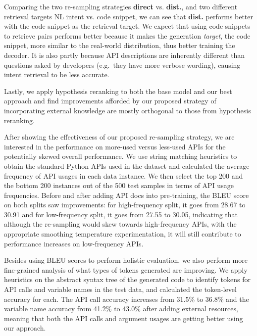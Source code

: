 \documentclass[11pt,a4paper]{article}
\begin{document}
Comparing the two re-sampling strategies \textbf{direct} vs. \textbf{dist.}, and two different retrieval targets NL intent vs. code snippet, we can see that \textbf{dist.} performs better with the code snippet as the retrieval target.
We expect that using code snippets to retrieve pairs performs better because it makes the generation \emph{target}, the code snippet, more similar to the real-world distribution, thus better training the decoder.
It is also partly because API descriptions are inherently different than questions asked by developers (e.g.~they have more verbose wording), causing intent retrieval to be less accurate. 


Lastly, we apply hypothesis reranking to both the base model and our best approach and find improvements afforded by our proposed strategy of incorporating external knowledge are mostly orthogonal to those from hypothesis reranking.

After showing the effectiveness of our proposed re-sampling strategy, we are interested in the performance on more-used versus less-used APIs for the potentially skewed overall performance.
We use string matching heuristics to obtain the standard Python APIs used in the dataset and calculated the average frequency of API usages in each data instance.
We then select the top 200 and the bottom 200 instances out of the 500 test samples in terms of API usage frequencies. 
Before and after adding API docs into pre-training, the BLEU score on both splits saw improvements: for high-frequency split, it goes from 28.67 to 30.91 and for low-frequency split, it goes from 27.55 to 30.05, indicating that although the re-sampling would skew towards high-frequency APIs, with the appropriate smoothing temperature experimentation, it will still contribute to performance increases on low-frequency APIs.

Besides using BLEU scores to perform holistic evaluation, we also perform more fine-grained analysis of what types of tokens generated are improving.
We apply heuristics on the abstract syntax tree of the generated code to identify tokens for API calls and variable names in the test data, and calculated the token-level accuracy for each. 
The API call accuracy increases from 31.5\% to 36.8\% and the variable name accuracy from 41.2\% to 43.0\% after adding external resources, meaning that both the API calls and argument usages are getting better using our approach.
\end{document}
